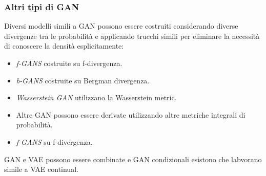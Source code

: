 		\subsubsection{Altri tipi di GAN}
		Diversi modelli simili a GAN possono essere costruiti considerando diverse divergenze tra le probabilit\`a e applicando trucchi simili per eliminare la necessit\`a di conoscere la densit\`a esplicitamente:
		\begin{multicols}{2}
			\begin{itemize}
				\item \emph{f-GANS} costruite su f-divergenza.
				\item \emph{b-GANS} costruite su Bergman divergenza.
				\item \emph{Wasserstein GAN} utilizzano la Wasserstein metric.
				\item Altre GAN possono essere derivate utilizzando altre metriche integrali di probabilit\`a.
				\item \emph{f-GANS} su f-divergenza.
			\end{itemize}
		\end{multicols}
		GAN e VAE possono essere combinate e GAN condizionali esistono che labvorano simile a VAE continual.

